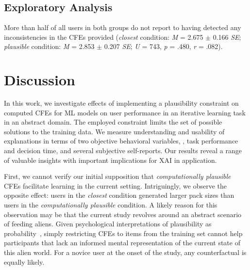 \subsection{Exploratory Analysis}
More than half of all users in both groups do not report to having detected any inconsistencies in the \glspl{CFE} provided (\textit{closest} condition: \textit{M} = 2.675 $\pm$ 0.166 \textit{SE}; \textit{plausible} condition: \textit{M} = 2.853 $\pm$ 0.207 \textit{SE}; \textit{U} = 743, \textit{p} = .480, \textit{r} = .082).

\section{Discussion}\label{sec:discussion}

In this work, we investigate effects of implementing a plausibility constraint on computed \glspl{CFE} for \gls{ML} models on user performance in an iterative learning task in an abstract domain. 
The employed constraint limits the set of possible solutions to the training data.
We measure understanding and usability of explanations in terms of two objective behavioral variables, \ie, task performance and decision time, and several subjective self-reports. 
Our results reveal a range of valuable insights with important implications for \gls{XAI} in application.

First, we cannot verify our initial supposition that \textit{computationally plausible} \glspl{CFE} facilitate learning in the current setting. 
Intriguingly, we observe the opposite effect: users in the \textit{closest} condition generated larger pack sizes than users in the \textit{computationally plausible} condition.
A likely reason for this observation may be that the current study revolves around an abstract scenario of feeding aliens. 
Given psychological interpretations of plausibility as probability~\citep{pezdek_is_2006, de_brigard_remembering_2013}, simply restricting \glspl{CFE} to items from the training set cannot help participants that lack an informed mental representation of the current state of this alien world. 
For a novice user at the onset of the study, any counterfactual is equally likely.

